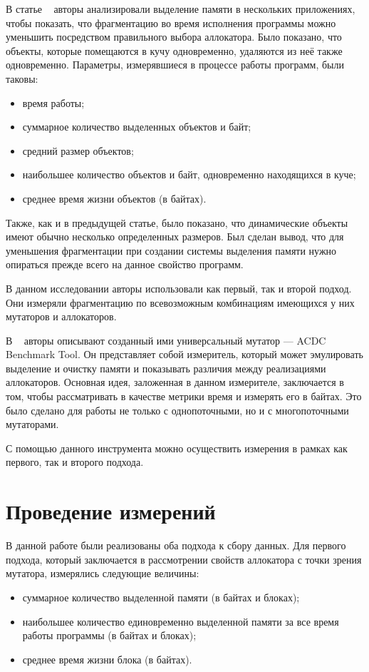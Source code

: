    В статье ~\cite{fragm} авторы анализировали выделение памяти в нескольких приложениях, чтобы показать, что фрагментацию
   во время исполнения программы можно уменьшить посредством правильного выбора аллокатора. Было показано, что объекты,
   которые помещаются в кучу одновременно, удаляются из неё также одновременно. 
   Параметры, измерявшиеся в процессе работы программ, были таковы:
   
   \begin{itemize}
      \item время работы;
      \item суммарное количество выделенных объектов и байт;
      \item средний размер объектов;
      \item наибольшее количество объектов и байт, одновременно находящихся в куче;
      \item среднее время жизни объектов (в байтах).
   \end{itemize}
   
   Также, как и в предыдущей статье, было показано, что динамические объекты имеют обычно несколько определенных размеров. Был сделан
   вывод, что для уменьшения фрагментации при создании системы выделения памяти нужно опираться прежде всего на данное свойство программ.
   
   В данном исследовании авторы использовали как первый, так и второй подход. Они измеряли фрагментацию по всевозможным комбинациям имеющихся 
   у них мутаторов и аллокаторов.
   
   В ~\cite{un_mutator} авторы описывают созданный ими универсальный мутатор --- ACDC Benchmark Tool. Он представляет собой измеритель, 
   который может эмулировать выделение и очистку памяти и показывать различия между реализациями аллокаторов. Основная идея, заложенная в данном 
   измерителе, заключается в том, чтобы рассматривать в качестве метрики время и измерять его в байтах. Это было сделано для работы не только с
   однопоточными, но и с многопоточными мутаторами. 
   
   С помощью данного инструмента можно осуществить измерения в рамках как первого, так и второго подхода.
   
   
   \section{Проведение измерений}
   В данной работе были реализованы оба подхода к сбору данных. Для первого подхода, который заключается в рассмотрении свойств аллокатора с точки зрения мутатора, измерялись следующие величины:
   \begin{itemize}
      \item суммарное количество выделенной памяти (в байтах и блоках);
      \item наибольшее количество единовременно выделенной памяти за все время работы программы (в байтах и блоках);
      \item среднее время жизни блока (в байтах).
   \end{itemize}
      
